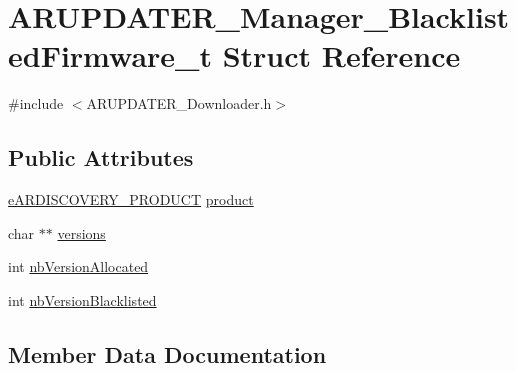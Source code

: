 \hypertarget{struct_a_r_u_p_d_a_t_e_r___manager___blacklisted_firmware__t}{}\section{A\+R\+U\+P\+D\+A\+T\+E\+R\+\_\+\+Manager\+\_\+\+Blacklisted\+Firmware\+\_\+t Struct Reference}
\label{struct_a_r_u_p_d_a_t_e_r___manager___blacklisted_firmware__t}


{\ttfamily \#include $<$A\+R\+U\+P\+D\+A\+T\+E\+R\+\_\+\+Downloader.\+h$>$}

\subsection*{Public Attributes}
\begin{DoxyCompactItemize}
\item 
\hyperlink{_a_r_d_i_s_c_o_v_e_r_y___discovery_8h_a908972407587656a48194c58ccd65813}{e\+A\+R\+D\+I\+S\+C\+O\+V\+E\+R\+Y\+\_\+\+P\+R\+O\+D\+U\+CT} \hyperlink{struct_a_r_u_p_d_a_t_e_r___manager___blacklisted_firmware__t_a32911d53621038e70a4ec024b85e8df0}{product}
\item 
char $\ast$$\ast$ \hyperlink{struct_a_r_u_p_d_a_t_e_r___manager___blacklisted_firmware__t_abed560cf241ce2b0926dbf41057e3b5a}{versions}
\item 
int \hyperlink{struct_a_r_u_p_d_a_t_e_r___manager___blacklisted_firmware__t_a0d1267996cd235bbb33e5e948d006d58}{nb\+Version\+Allocated}
\item 
int \hyperlink{struct_a_r_u_p_d_a_t_e_r___manager___blacklisted_firmware__t_accc202a4c3c65abd09ac93196d3d2465}{nb\+Version\+Blacklisted}
\end{DoxyCompactItemize}


\subsection{Member Data Documentation}
